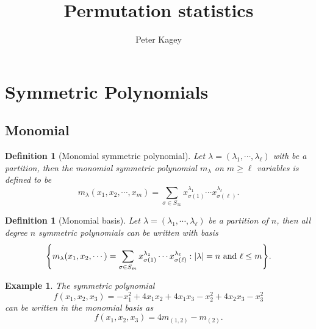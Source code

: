 \documentclass{article}
\let\originalleft\left
\let\originalright\right
\renewcommand{\left}{\mathopen{}\mathclose\bgroup\originalleft}
\renewcommand{\right}{\aftergroup\egroup\originalright}
\newcommand{\set}[1]{\left\{#1\right\}}
\newtheorem{definition}[theo]{Definition}
\newtheorem{example}[theo]{Example}
\begin{document}
\title{Permutation statistics}
\author{Peter Kagey}

\maketitle
\section{Symmetric Polynomials}
\subsection{Monomial}
\begin{definition}[Monomial symmetric polynomial]
  Let $\lambda = (\lambda_1, \cdots, \lambda_\ell)$ with be a partition, then
  the monomial symmetric polynomial $m_\lambda$ on $m \geq \ell$ variables is
  defined to be
  \[
    m_\lambda(x_1, x_2, \cdots, x_m)
    = \sum_{\sigma \in S_\infty}x_{\sigma(1)}^{\lambda_1} \cdots x_{\sigma(\ell)}^{\lambda_\ell}.
  \]
\end{definition}
\begin{definition}[Monomial basis]
  Let $\lambda = (\lambda_1, \cdots, \lambda_\ell)$ be a partition of $n$, then all degree $n$ symmetric polynomials
  can be written with basis \[
    \set{m_\lambda(x_1, x_2, \cdots)
    = \sum_{\sigma \in S_m}x_{\sigma(1)}^{\lambda_1} \cdots x_{\sigma(\ell)}^{\lambda_\ell}
    : |\lambda| = n \text{ and } \ell \leq m}.
  \]
\end{definition}
\begin{example}
  The symmetric polynomial \[
    f(x_1, x_2, x_3) = -x_1^2 + 4x_1x_2 + 4x_1x_3 - x_2^2 + 4x_2x_3 - x_3^2
  \] can be written in the monomial basis as \[
    f(x_1, x_2, x_3) = 4m_{(1,2)} - m_{(2)}.
  \]
\end{example}
\end{document}
